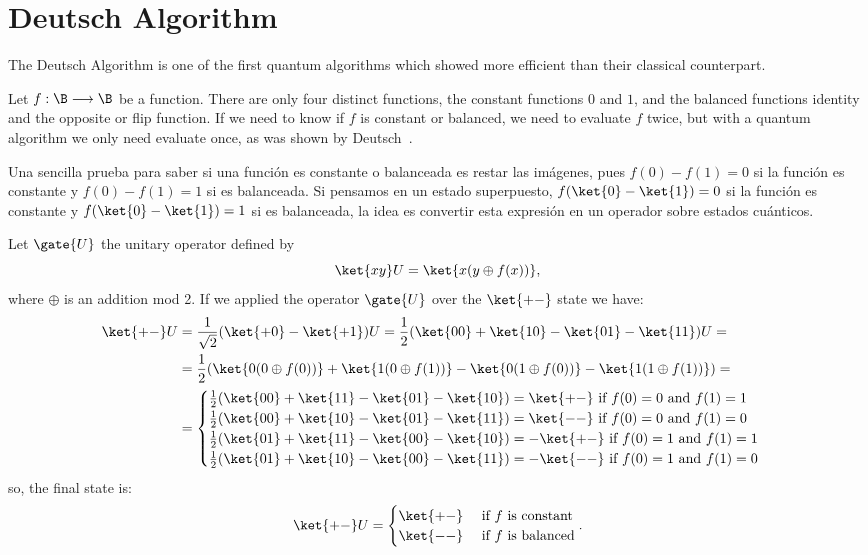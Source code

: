 \section{Deutsch Algorithm}\label{sec:deutsch-algorithm}
The Deutsch Algorithm is one of the first quantum algorithms which showed more efficient than their classical counterpart.

Let $f:\B\longrightarrow\B$ be a function.
There are only four distinct functions, the constant functions $0$ and $1$, and the balanced functions identity and the opposite or flip function.
If we need to know if $f$ is constant or balanced, we need to evaluate $f$ twice, but with a quantum algorithm we only need evaluate once, as was shown by Deutsch~\cite{Deutsch1985}.

Una sencilla prueba para saber si una función es constante o balanceada es restar las imágenes, pues $f(0)-f(1)=0$ si la función es constante y $f(0)-f(1)=1$ si es balanceada.
Si pensamos en un estado superpuesto, $f(\ket{0}-\ket{1})=0$ si la función es constante y $f(\ket{0}-\ket{1})=1$ si es balanceada, la idea es convertir esta expresión en un operador sobre estados cuánticos.

Let $\gate{U}$ the unitary operator defined by
\[
	\ket{xy}U=\ket{x(y\oplus f(x))},
\]
where $\oplus$ is an addition mod 2.
If we applied the operator $\gate{U}$ over the $\ket{+-}$ state we have:
\[
	\begin{split}
	\ket{+-}U &= \frac{1}{\sqrt{2}}(\ket{+0}-\ket{+1})U=\frac{1}{2}(\ket{00}+\ket{10}-\ket{01}-\ket{11})U=\\
	&= \frac{1}{2}(\ket{0(0\oplus f(0))}+\ket{1(0\oplus f(1))}-\ket{0(1\oplus f(0))}-\ket{1(1\oplus f(1))})=\\
		&=\begin{cases}
				\frac{1}{2}(\ket{00}+\ket{11}-\ket{01}-\ket{10})=\ket{+-}\text{ if $f(0)=0$ and $f(1) = 1$}\\
				\frac{1}{2}(\ket{00}+\ket{10}-\ket{01}-\ket{11})=\ket{--}\text{ if $f(0)=0$ and $f(1) = 0$}\\
				\frac{1}{2}(\ket{01}+\ket{11}-\ket{00}-\ket{10})=-\ket{+-}\text{ if $f(0)=1$ and $f(1) = 1$}\\
				\frac{1}{2}(\ket{01}+\ket{10}-\ket{00}-\ket{11})=-\ket{--}\text{ if $f(0)=1$ and $f(1) = 0$}
	\end{cases}
	\end{split}
\]
so, the final state is:
\[
	\ket{+-}U=\begin{cases}
		            \ket{+-} & \text{ if $f$ is constant} \\
		            \ket{--} & \text{ if $f$ is balanced}
	\end{cases}.
\]

